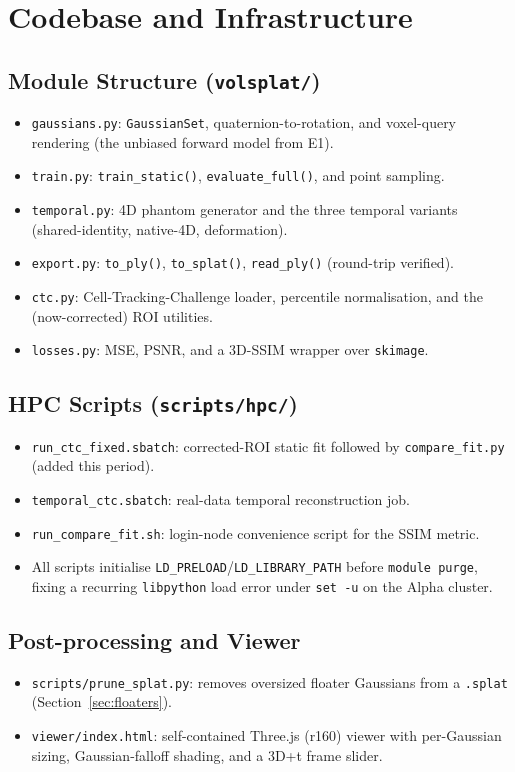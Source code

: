 \documentclass[11pt,a4paper]{article}
\newcommand{\code}[1]{\texttt{#1}}
\begin{document}
\section{Codebase and Infrastructure}

\subsection{Module Structure (\code{volsplat/})}
\begin{itemize}
    \item \code{gaussians.py}: \code{GaussianSet}, quaternion-to-rotation, and voxel-query
    rendering (the unbiased forward model from E1).
    \item \code{train.py}: \code{train\_static()}, \code{evaluate\_full()}, and point
    sampling.
    \item \code{temporal.py}: 4D phantom generator and the three temporal variants
    (shared-identity, native-4D, deformation).
    \item \code{export.py}: \code{to\_ply()}, \code{to\_splat()}, \code{read\_ply()}
    (round-trip verified).
    \item \code{ctc.py}: Cell-Tracking-Challenge loader, percentile normalisation, and the
    (now-corrected) ROI utilities.
    \item \code{losses.py}: MSE, PSNR, and a 3D-SSIM wrapper over \code{skimage}.
\end{itemize}

\subsection{HPC Scripts (\code{scripts/hpc/})}
\begin{itemize}
    \item \code{run\_ctc\_fixed.sbatch}: corrected-ROI static fit followed by
    \code{compare\_fit.py} (added this period).
    \item \code{temporal\_ctc.sbatch}: real-data temporal reconstruction job.
    \item \code{run\_compare\_fit.sh}: login-node convenience script for the SSIM metric.
    \item All scripts initialise \code{LD\_PRELOAD}/\code{LD\_LIBRARY\_PATH} before
    \code{module purge}, fixing a recurring \code{libpython} load error under
    \code{set -u} on the Alpha cluster.
\end{itemize}

\subsection{Post-processing and Viewer}
\begin{itemize}
    \item \code{scripts/prune\_splat.py}: removes oversized floater Gaussians from a
    \code{.splat} (Section~\ref{sec:floaters}).
    \item \code{viewer/index.html}: self-contained Three.js (r160) viewer with per-Gaussian
    sizing, Gaussian-falloff shading, and a 3D+t frame slider.
\end{itemize}
\end{document}

